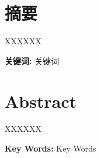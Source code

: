 \chapter*{摘\hspace{1.75\ccwd}要}

XXXXXX

\vspace{1.25\ccwd}\noindent\textbf{关键词:} 关键词

\chapter*{Abstract}

XXXXXX

\vspace{1.25\ccwd}\noindent\textbf{Key Words:} Key Words
